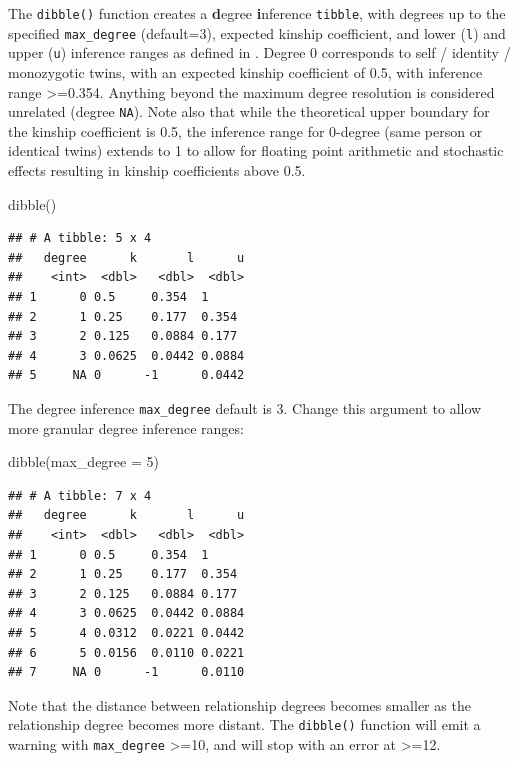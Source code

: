\documentclass[9pt,a4paper,]{extarticle}
\newenvironment{Shaded}{\begin{snugshade}}{\end{snugshade}}
\newcommand{\AttributeTok}[1]{\textcolor[rgb]{0.77,0.63,0.00}{#1}}
\newcommand{\DecValTok}[1]{\textcolor[rgb]{0.00,0.00,0.81}{#1}}
\newcommand{\FunctionTok}[1]{\textcolor[rgb]{0.00,0.00,0.00}{#1}}
\newcommand{\NormalTok}[1]{#1}
\begin{document}
The \texttt{dibble()} function creates a \textbf{d}egree \textbf{i}nference \texttt{tibble}, with degrees up to the specified \texttt{max\_degree} (default=3), expected kinship coefficient, and lower (\texttt{l}) and upper (\texttt{u}) inference ranges as defined in \citet{manichaikul2010}. Degree 0 corresponds to self / identity / monozygotic twins, with an expected kinship coefficient of 0.5, with inference range \textgreater=0.354. Anything beyond the maximum degree resolution is considered unrelated (degree \texttt{NA}). Note also that while the theoretical upper boundary for the kinship coefficient is 0.5, the inference range for 0-degree (same person or identical twins) extends to 1 to allow for floating point arithmetic and stochastic effects resulting in kinship coefficients above 0.5.

\begin{Shaded}
\begin{Highlighting}[]
\FunctionTok{dibble}\NormalTok{()}
\end{Highlighting}
\end{Shaded}

\begin{verbatim}
## # A tibble: 5 x 4
##   degree      k       l      u
##    <int>  <dbl>   <dbl>  <dbl>
## 1      0 0.5     0.354  1     
## 2      1 0.25    0.177  0.354 
## 3      2 0.125   0.0884 0.177 
## 4      3 0.0625  0.0442 0.0884
## 5     NA 0      -1      0.0442
\end{verbatim}

The degree inference \texttt{max\_degree} default is 3. Change this argument to allow more granular degree inference ranges:

\begin{Shaded}
\begin{Highlighting}[]
\FunctionTok{dibble}\NormalTok{(}\AttributeTok{max\_degree =} \DecValTok{5}\NormalTok{)}
\end{Highlighting}
\end{Shaded}

\begin{verbatim}
## # A tibble: 7 x 4
##   degree      k       l      u
##    <int>  <dbl>   <dbl>  <dbl>
## 1      0 0.5     0.354  1     
## 2      1 0.25    0.177  0.354 
## 3      2 0.125   0.0884 0.177 
## 4      3 0.0625  0.0442 0.0884
## 5      4 0.0312  0.0221 0.0442
## 6      5 0.0156  0.0110 0.0221
## 7     NA 0      -1      0.0110
\end{verbatim}

Note that the distance between relationship degrees becomes smaller as the relationship degree becomes more distant. The \texttt{dibble()} function will emit a warning with \texttt{max\_degree} \textgreater=10, and will stop with an error at \textgreater=12.
\end{document}
